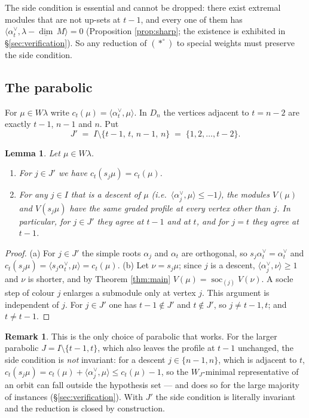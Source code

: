 \documentclass[reqno]{amsart}
\theoremstyle{plain}
\newtheorem{lemma}[theorem]{Lemma}
\theoremstyle{definition}
\newtheorem{remark}[theorem]{Remark}
\DeclareMathOperator{\soc}{soc}
\newcommand{\dimv}{\underline{\dim}\,}
\newcommand{\la}{\lambda}
\newcommand{\al}{\alpha}
\begin{document}
The side condition is essential and cannot be dropped: there exist extremal
modules that are not up-sets at $t-1$, and every one of them has
$\langle\al_t^\vee,\la-\dimv M\rangle=0$ (Proposition \ref{prop:sharp}; the
existence is exhibited in \S\ref{sec:verification}).  So any reduction of
$(*^\circ)$ to special weights must preserve the side condition.

\subsection{The parabolic}
For $\mu\in W\la$ write $c_t(\mu)=\langle\al_t^\vee,\mu\rangle$.  In $D_n$ the
vertices adjacent to $t=n-2$ are exactly $t-1$, $n-1$ and $n$.  Put
\[
   J'\;=\;I\setminus\{t-1,\,t,\,n-1,\,n\}\;=\;\{1,2,\dots,t-2\}.
\]

\begin{lemma}\label{lem:Jinv}
Let $\mu\in W\la$.
\begin{enumerate}
\item[\textup{(a)}] For $j\in J'$ we have $c_t(s_j\mu)=c_t(\mu)$.
\item[\textup{(b)}] For \emph{any} $j\in I$ that is a descent of $\mu$
\textup{(}i.e.\ $\langle\al_j^\vee,\mu\rangle\le-1$\textup{)}, the modules
$V(\mu)$ and $V(s_j\mu)$ have the same graded profile at every vertex other
than $j$.  In particular, for $j\in J'$ they agree at $t-1$ and at $t$, and for
$j=t$ they agree at $t-1$.
\end{enumerate}
\end{lemma}

\begin{proof}
(a) For $j\in J'$ the simple roots $\al_j$ and $\al_t$ are orthogonal, so
$s_j\al_t^\vee=\al_t^\vee$ and $c_t(s_j\mu)=\langle s_j\al_t^\vee,\mu\rangle
=c_t(\mu)$.  (b) Let $\nu=s_j\mu$; since $j$ is a
descent, $\langle\al_j^\vee,\nu\rangle\ge1$ and $\nu$ is shorter, and by
Theorem \ref{thm:main} $V(\mu)=\soc_{(j)}V(\nu)$.  A socle step of colour $j$
enlarges a submodule only at vertex $j$.  This argument is independent of $j$.
For $j\in J'$ one has $t-1\notin J'$ and $t\notin J'$, so $j\ne t-1,t$; and
$t\ne t-1$.
\end{proof}

\begin{remark}
This is the only choice of parabolic that works.  For the larger parabolic
$J=I\setminus\{t-1,t\}$, which also leaves the profile at $t-1$ unchanged, the
side condition is \emph{not} invariant: for a descent $j\in\{n-1,n\}$, which is
adjacent to $t$,
$c_t(s_j\mu)=c_t(\mu)+\langle\al_j^\vee,\mu\rangle\le c_t(\mu)-1$, so the
$W_J$-minimal representative of an orbit can fall outside the hypothesis set
--- and does so for the large majority of instances
(\S\ref{sec:verification}).  With $J'$ the side condition is literally
invariant and the reduction is closed by construction.
\end{remark}
\end{document}
